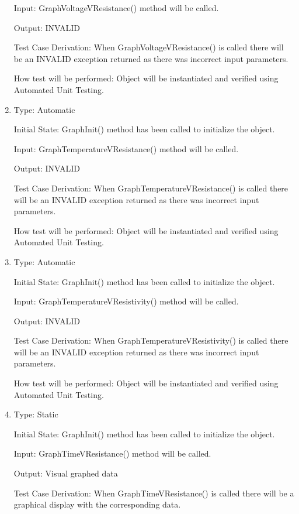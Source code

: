\documentclass[12pt, titlepage]{article}
\begin{document}
\begin{enumerate}[{UT-GO}1.]
Input: GraphVoltageVResistance() method will be called.
					
Output: INVALID

Test Case Derivation: When GraphVoltageVResistance() is called there will be an INVALID exception returned as there was incorrect input parameters.

How test will be performed: Object will be instantiated and verified using Automated Unit Testing.

\item

Type: Automatic
					
Initial State: GraphInit() method has been called to initialize the object.
					
Input: GraphTemperatureVResistance() method will be called.
					
Output: INVALID

Test Case Derivation: When GraphTemperatureVResistance() is called there will be an INVALID exception returned as there was incorrect input parameters.

How test will be performed: Object will be instantiated and verified using Automated Unit Testing.

\item

Type: Automatic
					
Initial State: GraphInit() method has been called to initialize the object.
					
Input: GraphTemperatureVResistivity() method will be called.
					
Output: INVALID

Test Case Derivation: When GraphTemperatureVResistivity() is called there will be an INVALID exception returned as there was incorrect input parameters.

How test will be performed: Object will be instantiated and verified using Automated Unit Testing.

\item

Type: Static
					
Initial State: GraphInit() method has been called to initialize the object.
					
Input: GraphTimeVResistance() method will be called.
					
Output: Visual graphed data

Test Case Derivation: When GraphTimeVResistance() is called there will be a graphical display with the corresponding data.


\end{enumerate}
\end{document}
